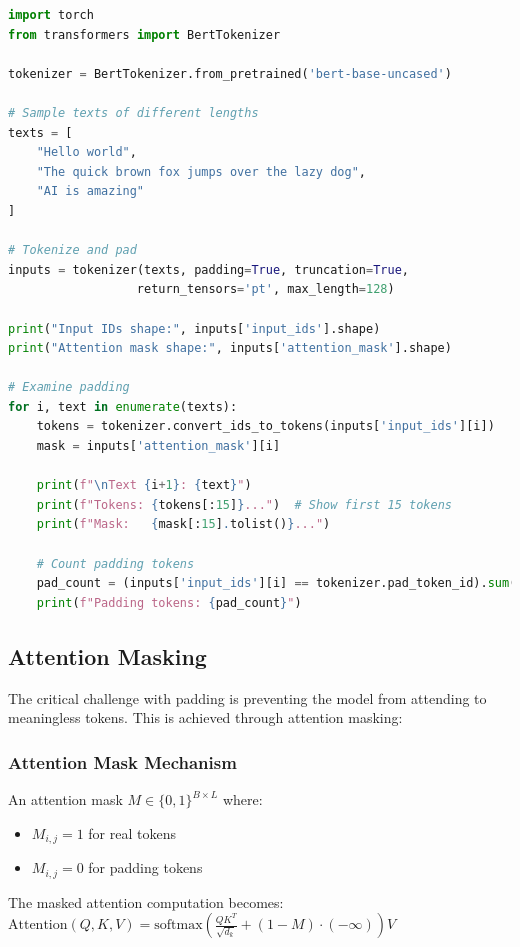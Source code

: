 \begin{lstlisting}[language=Python, caption=Padding Implementation]
import torch
from transformers import BertTokenizer

tokenizer = BertTokenizer.from_pretrained('bert-base-uncased')

# Sample texts of different lengths
texts = [
    "Hello world",
    "The quick brown fox jumps over the lazy dog",
    "AI is amazing"
]

# Tokenize and pad
inputs = tokenizer(texts, padding=True, truncation=True, 
                  return_tensors='pt', max_length=128)

print("Input IDs shape:", inputs['input_ids'].shape)
print("Attention mask shape:", inputs['attention_mask'].shape)

# Examine padding
for i, text in enumerate(texts):
    tokens = tokenizer.convert_ids_to_tokens(inputs['input_ids'][i])
    mask = inputs['attention_mask'][i]
    
    print(f"\nText {i+1}: {text}")
    print(f"Tokens: {tokens[:15]}...")  # Show first 15 tokens
    print(f"Mask:   {mask[:15].tolist()}...")
    
    # Count padding tokens
    pad_count = (inputs['input_ids'][i] == tokenizer.pad_token_id).sum()
    print(f"Padding tokens: {pad_count}")
\end{lstlisting}

\subsection{Attention Masking}

The critical challenge with padding is preventing the model from attending to meaningless \pad{} tokens. This is achieved through attention masking:

\subsubsection{Attention Mask Mechanism}
An attention mask $M \in \{0, 1\}^{B \times L}$ where:
\begin{itemize}
\item $M_{i,j} = 1$ for real tokens
\item $M_{i,j} = 0$ for padding tokens
\end{itemize}

The masked attention computation becomes:
$\text{Attention}(Q, K, V) = \text{softmax}\left(\frac{QK^T}{\sqrt{d_k}} + (1-M) \cdot (-\infty)\right)V$

